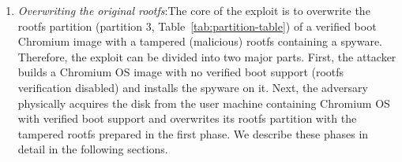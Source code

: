 \documentclass[11pt]{article}
\begin{document}
\begin{enumerate}
\item \emph{Overwriting the original rootfs}:The core of the exploit is to overwrite the rootfs partition (partition 3, Table~\ref{tab:partition-table}) of a verified boot Chromium image with a tampered (malicious) rootfs containing a spyware. Therefore, the exploit can be divided into two major parts. First, the attacker builds a Chromium OS image with no verified boot support (rootfs verification disabled) and installs the spyware on it. Next, the adversary physically acquires the disk from the user machine containing Chromium OS with verified boot support and overwrites its rootfs partition with the tampered rootfs prepared in the first phase. We describe these phases in detail in the following sections.




\end{enumerate}
\end{document}
